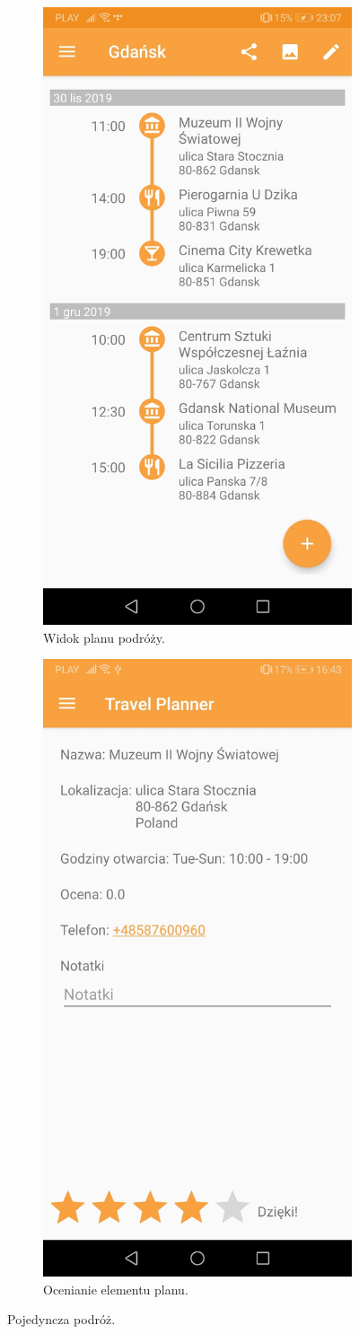 \documentclass[10pt,twoside,a4paper]{report}
\begin{document}
\begin{figure}[h]
\centering
\begin{subfigure}{0.4\textwidth}
\centering
\includegraphics[width=0.9\linewidth, width=5cm]{planElements}
\caption{Widok planu podróży.}
\label{fig:planElements}
\end{subfigure}
\begin{subfigure}{0.4\textwidth}
\centering
\includegraphics[width=0.9\linewidth, width=5cm]{ratePlace2}
\caption{Ocenianie elementu planu.}
\label{fig:ratePlace2}
\end{subfigure}
\caption{Pojedyncza podróż.}
\label{fig:podrecznik4}
\end{figure}
\FloatBarrier
\end{document}
